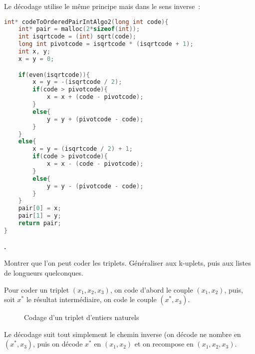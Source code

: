 \documentclass{article}
\newcounter{enoncecount}
\newenvironment{enonce}
{
\stepcounter{enoncecount}
\bf\small \arabic{enoncecount}.
\begin{bf}
}
{
\end{bf}
}
\begin{document}
Le décodage utilise le même principe mais dans le sens inverse~:

\begin{lstlisting}[language=C]
int* codeToOrderedPairIntAlgo2(long int code){
	int* pair = malloc(2*sizeof(int));
	int isqrtcode = (int) sqrt(code);
	long int pivotcode = isqrtcode * (isqrtcode + 1);
	int x, y;
	x = y = 0;	

	if(even(isqrtcode)){
		x = y = -(isqrtcode / 2);
		if(code > pivotcode){
			x = x + (code - pivotcode);
		}
		else{
			y = y + (pivotcode - code);
		}
	}
	else{
		x = y = (isqrtcode / 2) + 1;
		if(code > pivotcode){
			x = x - (code - pivotcode);
		}
		else{
			y = y - (pivotcode - code); 
		}
	}
	pair[0] = x;
	pair[1] = y; 
	return pair;
}
\end{lstlisting}



\begin{enonce}
Montrer que l'on peut coder les triplets. Généraliser aux k-uplets, puis aux listes de longueurs quelconques.
\end{enonce}

Pour coder un triplet $(x_1, x_2, x_3)$, on code d'abord le couple $(x_1, x_2)$, puis, soit $x^*$ le résultat intermédiaire, on code le couple $(x^*, x_3)$.

\begin{figure}[ht!]
  \centering
  \caption{Codage d'un triplet d'entiers naturels}
  \label{fig:codage-couple}
\end{figure}

Le décodage suit tout simplement le chemin inverse (on décode ne nombre en $(x^*, x_3)$, puis on décode $x^*$ en $(x_1, x_2)$ et on recompose en $(x_1, x_2, x_3)$.
\end{document}
